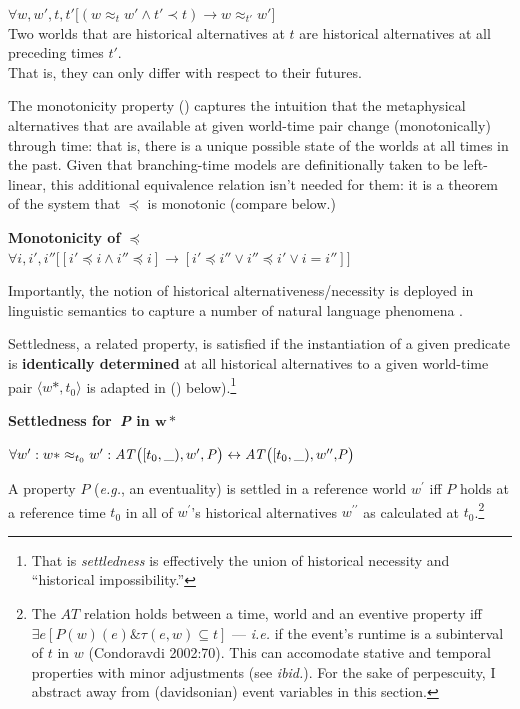 \documentclass[11pt,dvipsnames]{report}
\begin{document}
	 $ \forall w,w',t,t'\big[(w\approx_t w'\wedge t'\prec t)\to w\approx_{t'} w'\big]$\\
	Two worlds that are historical alternatives at $t$ are historical alternatives at all preceding times $t'$.\\That is, they can only differ with respect to their futures.
	\xe

The monotonicity property () captures the intuition that the metaphysical alternatives that are available at given world-time pair change (monotonically) through time: that is, there is a unique possible state of the worlds at all times in the past.  Given that branching-time models are definitionally taken to be left-linear, this additional equivalence relation isn't needed for them: it is a theorem of the system that $ \preccurlyeq $ is monotonic (compare  below.)

\pex[exno=\getref{histaltdef}]
\a[label=b′] \textbf{Monotonicity of $ \boldsymbol\preccurlyeq $}\\$ \forall i,i',i''\big[[i'\preccurlyeq i\wedge i''\preccurlyeq i]\to [i'\preccurlyeq i'' \vee i'' \preccurlyeq i' \vee i=i'']\big] $
\xe


Importantly, the notion of historical alternativeness/necessity is deployed in linguistic semantics to capture a number of natural language phenomena \citep[e.g.,][]{Thomason1984,Condoravdi2002,Kaufmann2002}.

Settledness, a related property, is satisfied if the instantiation of a given predicate is \textbf{identically determined} at all historical alternatives to a given world-time pair $\langle w*,t_0\rangle $ is adapted in () below).\footnote{That is \textit{settledness} is effectively the union of historical necessity and ``historical impossibility.''}

\pex \textbf{Settledness for\textbf{\textit{\ P}} in $ \boldsymbol{w*}$}


$\forall w^{\prime}:w*\approx_{t_0}w^{\prime}:\\\mathit{AT}\big([t_0,\_),w^\prime, \mathit P\big)\leftrightarrow \mathit{AT}\big([t_0,\_),w^{\prime\prime},\mathit{\!P}\big)$%


A property $P$ (\textit{e.g.}, an eventuality) is settled in a reference world $w^\prime$ iff $\mathit P$ holds at a reference time $t_0$ in all of $w^\prime$'s historical alternatives $w^{\prime\prime}$ as calculated at $t_0$.\footnote{The $AT$ relation holds between a time, world and an eventive property iff $\exists e[\mathit P(w)(e)\&\tau(e,w)\subseteq t]$ --- \textit{i.e.} if the event's runtime is a subinterval of $t$ in $w$ (Condoravdi 2002:70). This can accomodate stative and temporal properties with minor adjustments (see \textit{ibid.}). For the sake of perpescuity, I abstract away from (davidsonian) event variables in this section.}
\xe
\end{document}
